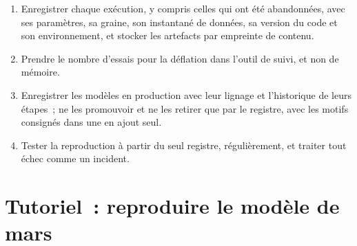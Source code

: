 \begin{method}\label{met:ml:exp:method}
\begin{enumerate}
\item Enregistrer chaque exécution, y compris celles qui ont été abandonnées, avec ses paramètres, sa graine, son instantané de données, sa version du code et son environnement, et
stocker les artefacts par empreinte de contenu.
\item Prendre le nombre d'essais pour la déflation dans l'outil de suivi, et non de mémoire.
\item Enregistrer les modèles en production avec leur lignage et l'historique de leurs étapes~; ne les promouvoir et ne les retirer que par le registre, avec les motifs consignés dans
une  en ajout seul.
\item Tester la reproduction à partir du seul registre, régulièrement, et traiter tout échec comme un incident.
\end{enumerate}
\end{method}

\section{Tutoriel~: reproduire le modèle de mars}\label{tut:ml:experiment-tracking-and-reproducibility:tut}


